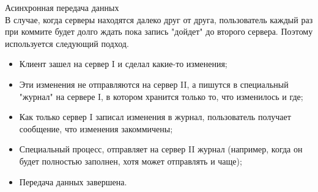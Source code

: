 Асинхронная передача данных \\
В случае, когда серверы находятся далеко друг от друга, пользователь каждый раз при коммите будет долго ждать пока запись "дойдет" до второго сервера. Поэтому используется следующий подход. 
\begin {itemize}
\item Клиент зашел на сервер I и сделал какие-то изменения;
\item Эти изменения не отправляются на сервер II, а пишутся в специальный "журнал"  на сервере I, в котором хранится только то, что изменилось и где;
\item Как только сервер I записал изменения в журнал, пользователь получает сообщение, что изменения закоммичены;
\item Специальный процесс, отправляет на сервер II журнал (например, когда он будет полностью заполнен, хотя может отправлять и чаще);
\item Передача данных завершена.
\end {itemize}